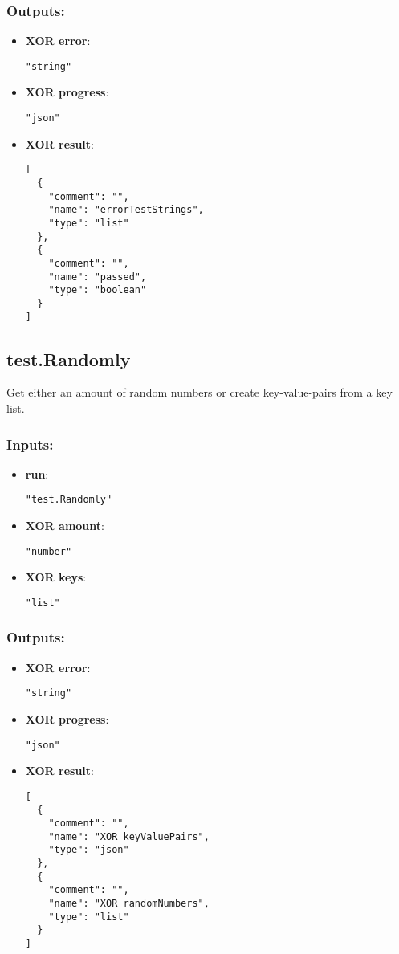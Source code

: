 \subsubsection*{Outputs:}
\begin{itemize}
    \item \textbf{XOR error}: 
\begin{lstlisting}
"string"
\end{lstlisting}
    \item \textbf{XOR progress}: 
\begin{lstlisting}
"json"
\end{lstlisting}
    \item \textbf{XOR result}: 
\begin{lstlisting}
[
  {
    "comment": "", 
    "name": "errorTestStrings", 
    "type": "list"
  }, 
  {
    "comment": "", 
    "name": "passed", 
    "type": "boolean"
  }
]
\end{lstlisting}
  \end{itemize}

\subsection{test.Randomly}
Get either an amount of random numbers or create key-value-pairs from a key list.
\subsubsection*{Inputs:}
\begin{itemize}
    \item \textbf{run}: 
\begin{lstlisting}
"test.Randomly"
\end{lstlisting}
    \item \textbf{XOR amount}: 
\begin{lstlisting}
"number"
\end{lstlisting}
    \item \textbf{XOR keys}: 
\begin{lstlisting}
"list"
\end{lstlisting}
  \end{itemize}

\subsubsection*{Outputs:}
\begin{itemize}
    \item \textbf{XOR error}: 
\begin{lstlisting}
"string"
\end{lstlisting}
    \item \textbf{XOR progress}: 
\begin{lstlisting}
"json"
\end{lstlisting}
    \item \textbf{XOR result}: 
\begin{lstlisting}
[
  {
    "comment": "", 
    "name": "XOR keyValuePairs", 
    "type": "json"
  }, 
  {
    "comment": "", 
    "name": "XOR randomNumbers", 
    "type": "list"
  }
]
\end{lstlisting}
  \end{itemize}

